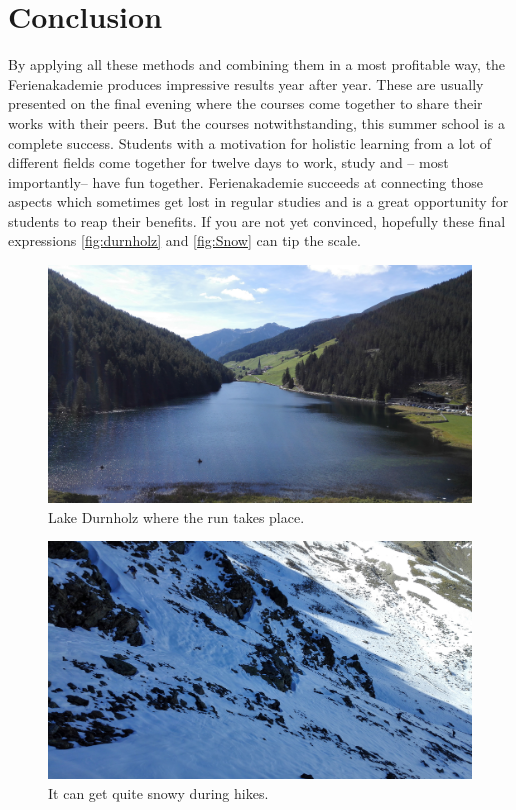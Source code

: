 \section{Conclusion}
By applying all these methods and combining them in a most profitable way, the Ferienakademie produces impressive results year after year. These are usually presented on the final evening where the courses come together to share their works with their peers. But the courses notwithstanding, this summer school is a complete success. Students with a motivation for holistic learning from a lot of different fields come together for twelve days to work, study and -- most importantly-- have fun together. Ferienakademie succeeds at connecting those aspects which sometimes get lost in regular studies and is a great opportunity for students to reap their benefits. If you are not yet convinced, hopefully these final expressions \autoref{fig:durnholz} and \autoref{fig:Snow} can tip the scale.
\begin{figure}[ht]%
 	\begin{center}%
 		\includegraphics[scale=0.045]{img/Durnholz.jpg}%
 		\caption{Lake Durnholz where the run takes place.}\label{fig:durnholz}%
 	\end{center}%
\end{figure}
\begin{figure}[ht]%
 	\begin{center}%
 		\includegraphics[scale=0.045]{img/Snow.jpg}%
 		\caption{It can get quite snowy during hikes.}\label{fig:Snow}%
 	\end{center}%
\end{figure}
